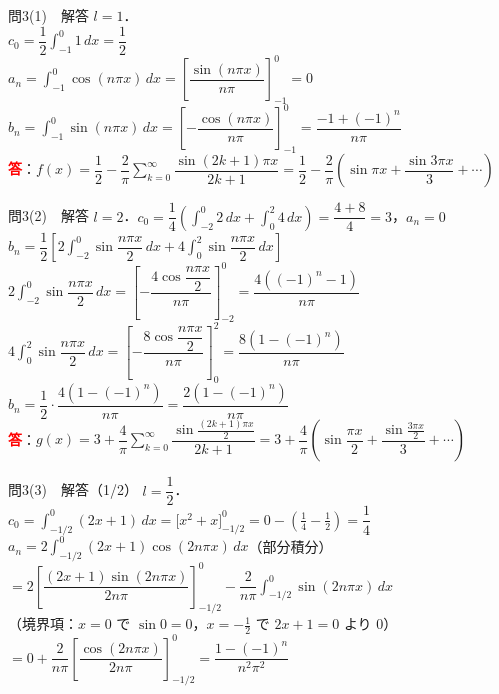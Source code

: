 \documentclass[professionalfonts]{beamer}
\begin{document}
\begin{frame}{問3(1)　解答}
  $l=1$．\\[4pt]
  $c_{0}=\dfrac{1}{2}\displaystyle\int_{-1}^{0}1\,dx=\dfrac{1}{2}$\\[6pt]
  $a_{n}=\displaystyle\int_{-1}^{0}\cos(n\pi x)\,dx
    =\left[\dfrac{\sin(n\pi x)}{n\pi}\right]_{-1}^{0}=0$\\[6pt]
  $b_{n}=\displaystyle\int_{-1}^{0}\sin(n\pi x)\,dx
    =\left[-\dfrac{\cos(n\pi x)}{n\pi}\right]_{-1}^{0}
    =\dfrac{-1+(-1)^{n}}{n\pi}$
  \\[8pt]\textcolor{red}{\textbf{答}}：$f(x) = \dfrac{1}{2} - \dfrac{2}{\pi}\displaystyle\sum_{k=0}^{\infty} \dfrac{\sin(2k+1)\pi x}{2k+1} = \dfrac{1}{2} - \dfrac{2}{\pi}\!\left(\sin \pi x + \dfrac{\sin 3\pi x}{3} + \cdots\right)$\\
\end{frame}

\begin{frame}{問3(2)　解答}
  $l=2$．$c_{0}=\dfrac{1}{4}\!\left(\displaystyle\int_{-2}^{0}2\,dx+\int_{0}^{2}4\,dx\right)=\dfrac{4+8}{4}=3$，$a_{n}=0$\\[4pt]
  $b_{n}=\dfrac{1}{2}\!\left[2\displaystyle\int_{-2}^{0}\sin\dfrac{n\pi x}{2}\,dx+4\int_{0}^{2}\sin\dfrac{n\pi x}{2}\,dx\right]$\\[4pt]
  $2\displaystyle\int_{-2}^{0}\sin\dfrac{n\pi x}{2}\,dx
    =\left[-\dfrac{4\cos\dfrac{n\pi x}{2}}{n\pi}\right]_{-2}^{0}
    =\dfrac{4((-1)^{n}-1)}{n\pi}$\\[4pt]
  $4\displaystyle\int_{0}^{2}\sin\dfrac{n\pi x}{2}\,dx
    =\left[-\dfrac{8\cos\dfrac{n\pi x}{2}}{n\pi}\right]_{0}^{2}
    =\dfrac{8(1-(-1)^{n})}{n\pi}$\\[4pt]
  $b_{n}=\dfrac{1}{2}\!\cdot\!\dfrac{4(1-(-1)^{n})}{n\pi}=\dfrac{2(1-(-1)^{n})}{n\pi}$
  \\[8pt]\textcolor{red}{\textbf{答}}：$g(x) = 3 + \dfrac{4}{\pi}\displaystyle\sum_{k=0}^{\infty} \dfrac{\sin\frac{(2k+1)\pi x}{2}}{2k+1} = 3 + \dfrac{4}{\pi}\!\left(\sin\dfrac{\pi x}{2} + \dfrac{\sin\frac{3\pi x}{2}}{3} + \cdots\right)$\\
\end{frame}

\begin{frame}{問3(3)　解答（1/2）}
  $l=\dfrac{1}{2}$．\\[4pt]
  $c_{0}=\displaystyle\int_{-1/2}^{0}(2x+1)\,dx
    =\bigl[x^{2}+x\bigr]_{-1/2}^{0}
    =0-\!\left(\tfrac{1}{4}-\tfrac{1}{2}\right)=\dfrac{1}{4}$\\[6pt]
  $a_{n}=2\displaystyle\int_{-1/2}^{0}(2x+1)\cos(2n\pi x)\,dx$\quad（部分積分）\\[4pt]
  $=2\!\left[\dfrac{(2x+1)\sin(2n\pi x)}{2n\pi}\right]_{-1/2}^{0}
   -\dfrac{2}{n\pi}\displaystyle\int_{-1/2}^{0}\sin(2n\pi x)\,dx$\\[2pt]
  {\footnotesize（境界項：$x=0$ で $\sin 0=0$，$x=-\tfrac{1}{2}$ で $2x+1=0$ より 0）}\\[2pt]
  $=0+\dfrac{2}{n\pi}\!\left[\dfrac{\cos(2n\pi x)}{2n\pi}\right]_{-1/2}^{0}
   =\dfrac{1-(-1)^{n}}{n^{2}\pi^{2}}$
\end{frame}
\end{document}
